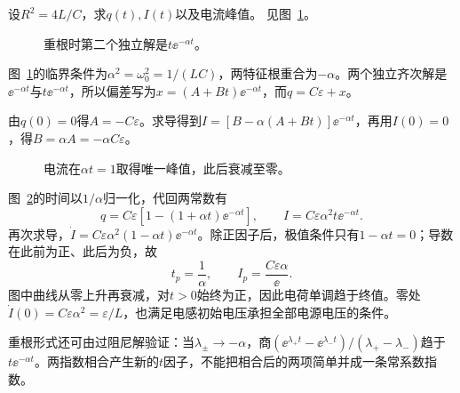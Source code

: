 \begin{example}[临界阻尼的重根]\label{ex:c4-rlc-critical}
设$R^2=4L/C$，求$q(t),I(t)$以及电流峰值。 见图~\ref{fig:c4-rlc-critical-q}。
\end{example}

\begin{figure}[H]\centering
{}
\caption{重根时第二个独立解是$t\ee^{-\alpha t}$。}\label{fig:c4-rlc-critical-q}
\end{figure}
\begin{solution}
图~\ref{fig:c4-rlc-critical-q}的临界条件为$\alpha^2=\omega_0^2=1/(LC)$，两特征根重合为$-\alpha$。两个独立齐次解是$\ee^{-\alpha t}$与$t\ee^{-\alpha t}$，所以偏差写为$x=(A+Bt)\ee^{-\alpha t}$，而$q=C\varepsilon+x$。

由$q(0)=0$得$A=-C\varepsilon$。求导得到$I=[B-\alpha(A+Bt)]\ee^{-\alpha t}$，再用$I(0)=0$，得$B=\alpha A=-\alpha C\varepsilon$。
\begin{figure}[H]\centering
{}
\caption{电流在$\alpha t=1$取得唯一峰值，此后衰减至零。}\label{fig:c4-rlc-critical-s}
\end{figure}
图~\ref{fig:c4-rlc-critical-s}的时间以$1/\alpha$归一化，代回两常数有
\[
 \boxed{q=C\varepsilon[1-(1+\alpha t)\ee^{-\alpha t}]},\qquad
 \boxed{I=C\varepsilon\alpha^2t\ee^{-\alpha t}}.
\]
再次求导，$\dot I=C\varepsilon\alpha^2(1-\alpha t)\ee^{-\alpha t}$。除正因子后，极值条件只有$1-\alpha t=0$；导数在此前为正、此后为负，故
\[
 \boxed{t_p=\frac1\alpha,\qquad I_p=\frac{C\varepsilon\alpha}{\ee}}.
\]
图中曲线从零上升再衰减，对$t>0$始终为正，因此电荷单调趋于终值。零处$\dot I(0)=C\varepsilon\alpha^2=\varepsilon/L$，也满足电感初始电压承担全部电源电压的条件。

重根形式还可由过阻尼解验证：当$\lambda_\pm\to-\alpha$，商$(\ee^{\lambda_+t}-\ee^{\lambda_-t})/(\lambda_+-\lambda_-)$趋于$t\ee^{-\alpha t}$。两指数相合产生新的$t$因子，不能把相合后的两项简单并成一条常系数指数。
\end{solution}

